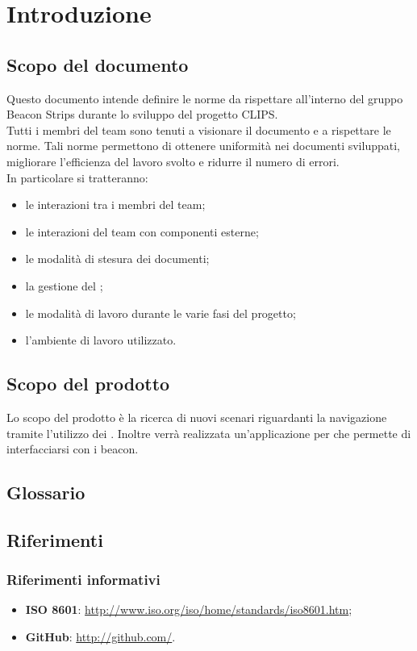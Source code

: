 \section{Introduzione}
	\subsection{Scopo del documento}
	Questo documento intende definire le norme da rispettare all'interno del gruppo Beacon Strips durante lo sviluppo del progetto CLIPS. \\
	Tutti i membri del team sono tenuti a visionare il documento e a rispettare le norme. Tali norme permettono di ottenere uniformità nei documenti sviluppati,
	migliorare l'efficienza del lavoro svolto e ridurre il numero di errori. \\
	In particolare si tratteranno:
	\begin{itemize}
		\item le interazioni tra i membri del team;
		\item le interazioni del team con componenti esterne;
		\item le modalità di stesura dei documenti;
		\item la gestione del ;
		\item le modalità di lavoro durante le varie fasi del progetto;
		\item l'ambiente di lavoro utilizzato.
	\end{itemize}
	
	\subsection{Scopo del prodotto}
	Lo scopo del prodotto è la ricerca di nuovi scenari riguardanti la navigazione tramite l'utilizzo dei . Inoltre verrà realizzata un'applicazione per  che permette di interfacciarsi con i beacon.
	\subsection{Glossario}
		\GLOSSARIO
	\subsection{Riferimenti}
		\subsubsection{Riferimenti informativi}
		\begin{itemize}
			\item \textbf{ISO 8601}: \url{http://www.iso.org/iso/home/standards/iso8601.htm};
			\item \textbf{GitHub}: \url{http://github.com/}.
		\end{itemize}
	
